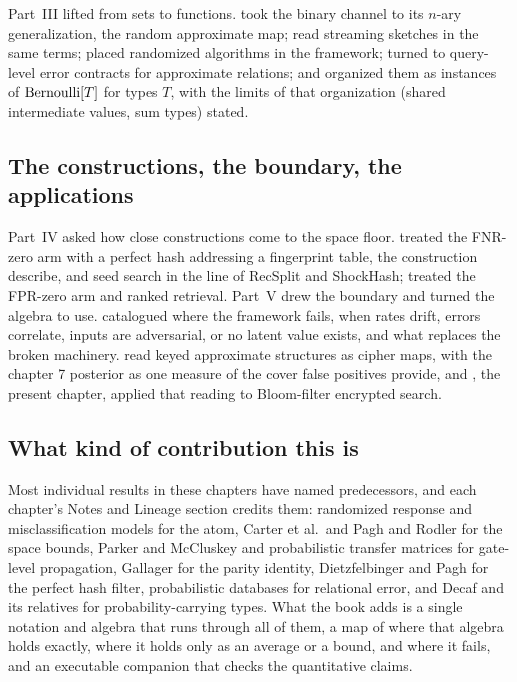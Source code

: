 Part~III lifted from sets to functions. 
took the binary channel to its $n$-ary generalization, the random
approximate map;  read streaming sketches in
the same terms;  placed randomized
algorithms in the framework;  turned to
query-level error contracts for approximate relations; and
 organized them as instances of $\mathrm{Bernoulli}[T]$
for types $T$, with the limits of that organization (shared intermediate
values, sum types) stated.

\subsection*{The constructions, the boundary, the applications}

Part~IV asked how close constructions come to the space floor.
 treated the FNR-zero arm with a perfect
hash addressing a fingerprint table, the construction
\textcite{dietzfelbinger-pagh-2008} describe, and seed search in the line
of RecSplit and ShockHash;  treated the
FPR-zero arm and ranked retrieval. Part~V drew the boundary and turned the
algebra to use.  catalogued where the framework
fails, when rates drift, errors correlate, inputs are adversarial, or no
latent value exists, and what replaces the broken machinery.
 read keyed approximate structures as cipher
maps, with the chapter 7 posterior as one measure of the cover false
positives provide, and , the present chapter,
applied that reading to Bloom-filter encrypted search.

\subsection*{What kind of contribution this is}

Most individual results in these chapters have named predecessors, and
each chapter's Notes and Lineage section credits them: randomized
response and misclassification models for the atom, Carter et al.\ and
Pagh and Rodler for the space bounds, Parker and McCluskey and
probabilistic transfer matrices for gate-level propagation, Gallager for
the parity identity, Dietzfelbinger and Pagh for the perfect hash filter,
probabilistic databases for relational error, and Decaf and its relatives
for probability-carrying types. What the book adds is a single notation
and algebra that runs through all of them, a map of where that algebra
holds exactly, where it holds only as an average or a bound, and where it
fails, and an executable companion that checks the quantitative claims.

